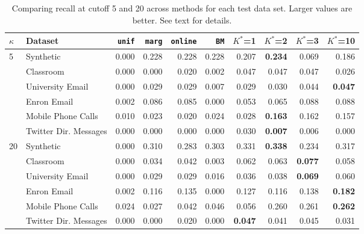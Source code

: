 \begin{table*}[t]
\begin{center}
{\footnotesize
\begin{tabular}{llrrrrrrrr}
  \hline
$\kappa$ & Dataset & \texttt{unif} & \texttt{marg} & \texttt{online} & \texttt{BM} & $K^*$=1 & $K^*$=2 & $K^*$=3 & $K^*$=10 \\ 
  \hline
5 & Synthetic & 0.000 & 0.228 & 0.228 & 0.228 & 0.207 & \textbf{0.234} & 0.069 & 0.186 \\ 
   & Classroom & 0.000 & 0.000 & 0.020 & 0.002 & 0.047 & 0.047 & 0.047 & 0.026 \\ 
   & University Email & 0.000 & 0.029 & 0.029 & 0.007 & 0.029 & 0.030 & 0.044 & \textbf{0.047} \\ 
   & Enron Email & 0.002 & 0.086 & 0.085 & 0.000 & 0.053 & 0.065 & 0.088 & 0.088 \\ 
   & Mobile Phone Calls & 0.010 & 0.023 & 0.020 & 0.024 & 0.028 & \textbf{0.163} & 0.162 & 0.157 \\ 
   & Twitter Dir. Messages & 0.000 & 0.000 & 0.000 & 0.000 & 0.030 & \textbf{0.007} & 0.006 & 0.000 \\ 
  20 & Synthetic & 0.000 & 0.310 & 0.283 & 0.303 & 0.331 & \textbf{0.338} & 0.234 & 0.317 \\ 
   & Classroom & 0.000 & 0.034 & 0.042 & 0.003 & 0.062 & 0.063 & \textbf{0.077} & 0.058 \\ 
   & University Email & 0.000 & 0.029 & 0.029 & 0.016 & 0.036 & 0.038 & \textbf{0.069} & 0.060 \\ 
   & Enron Email & 0.002 & 0.116 & 0.135 & 0.000 & 0.127 & 0.116 & 0.138 & \textbf{0.182} \\ 
   & Mobile Phone Calls & 0.024 & 0.027 & 0.042 & 0.046 & 0.056 & 0.260 & 0.261 & \textbf{0.262} \\ 
   & Twitter Dir. Messages & 0.000 & 0.000 & 0.020 & 0.000 & \textbf{0.047} & 0.041 & 0.045 & 0.031 \\ 
   \hline
\end{tabular}
}
\caption{Comparing recall at cutoff 5 and 20 across methods for each test data set.  Larger values are better.  See text for details.}
\label{tab:recall20}
\end{center}
\end{table*}
